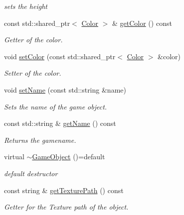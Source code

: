 \begin{DoxyCompactItemize}
\begin{DoxyCompactList}\small\item\em sets the height \end{DoxyCompactList}\item 
const std\+::shared\+\_\+ptr$<$ \hyperlink{structColor}{Color} $>$ \& \hyperlink{classGameObject_aa51b4277277c1c851e59847015c937e8}{get\+Color} () const
\begin{DoxyCompactList}\small\item\em Getter of the color. \end{DoxyCompactList}\item 
void \hyperlink{classGameObject_a9751f8cfc3a86b61524879fb3f0aea79}{set\+Color} (const std\+::shared\+\_\+ptr$<$ \hyperlink{structColor}{Color} $>$ \&color)
\begin{DoxyCompactList}\small\item\em Setter of the color. \end{DoxyCompactList}\item 
void \hyperlink{classGameObject_a728c8a03416fd7bde2498d79ae6c26a3}{set\+Name} (const std\+::string \&name)
\begin{DoxyCompactList}\small\item\em Sets the name of the game object. \end{DoxyCompactList}\item 
const std\+::string \& \hyperlink{classGameObject_a72c04187da1840a922b7cbafa12e4882}{get\+Name} () const
\begin{DoxyCompactList}\small\item\em Returns the gamename. \end{DoxyCompactList}\item 
\mbox{\label{classGameObject_a67ae2fa6e7916c799700cd659975d8ea}} 
virtual \hyperlink{classGameObject_a67ae2fa6e7916c799700cd659975d8ea}{$\sim$\+Game\+Object} ()=default
\begin{DoxyCompactList}\small\item\em default destructor \end{DoxyCompactList}\item 
const string \& \hyperlink{classGameObject_a008037b2f4572fe79d38d5abea5b1058}{get\+Texture\+Path} () const
\begin{DoxyCompactList}\small\item\em Getter for the Texture path of the object. \end{DoxyCompactList}\item 

\end{DoxyCompactItemize}
